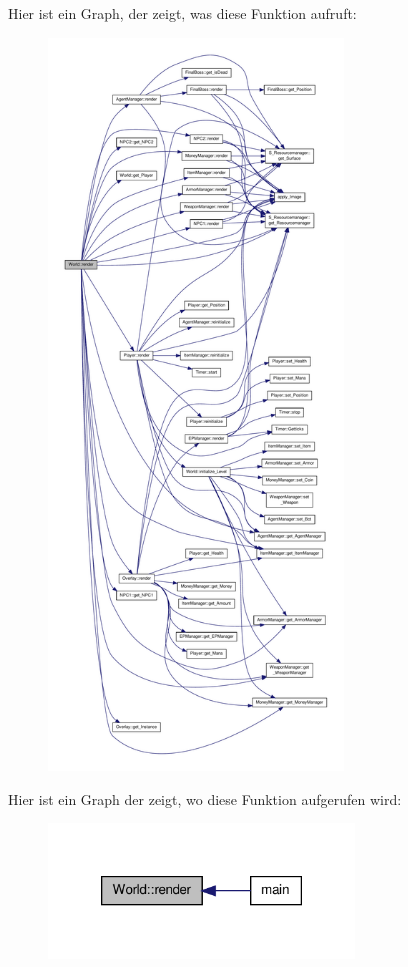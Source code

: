 Hier ist ein Graph, der zeigt, was diese Funktion aufruft\-:\nopagebreak
\begin{figure}[H]
\begin{center}
\leavevmode
\includegraphics[height=550pt]{class_world_a15a2d4bb5a4f26400a6c1365d8eb4875_cgraph}
\end{center}
\end{figure}




Hier ist ein Graph der zeigt, wo diese Funktion aufgerufen wird\-:\nopagebreak
\begin{figure}[H]
\begin{center}
\leavevmode
\includegraphics[width=230pt]{class_world_a15a2d4bb5a4f26400a6c1365d8eb4875_icgraph}
\end{center}
\end{figure}


